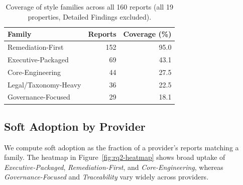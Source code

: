     \begin{table}[t]
    \centering
    \small
    \begin{tabular}{lrr}
    \toprule
    Family & Reports & Coverage (\%) \\
\midrule
Remediation-First & 152 & 95.0 \\
Executive-Packaged & 69 & 43.1 \\
Core-Engineering & 44 & 27.5 \\
Legal/Taxonomy-Heavy & 36 & 22.5 \\
Governance-Focused & 29 & 18.1 \\
    \bottomrule
    \end{tabular}
    \caption{Coverage of style families across all 160 reports (all 19 properties, Detailed Findings excluded).}
    \label{tab:rq2-families}
    \end{table}


\subsection{Soft Adoption by Provider}
We compute soft adoption as the fraction of a provider's reports matching a family. The heatmap in Figure~\ref{fig:rq2-heatmap}
shows broad uptake of \emph{Executive-Packaged}, \emph{Remediation-First}, and \emph{Core-Engineering}, whereas \emph{Governance-Focused}
and \emph{Traceability} vary widely across providers.

